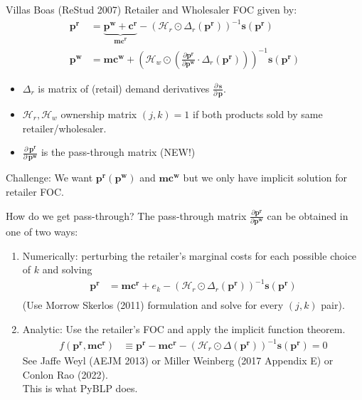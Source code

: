 \begin{frame}{Villas Boas (ReStud 2007)}
Retailer and Wholesaler FOC given by:
\begin{align*}
\symbf{p^r} &= \underbrace{\symbf{p^w} +\symbf{c^r}}_{\symbf{mc^r}} -(\mathcal{H}_r \odot \Delta_{r}(\symbf{p^r}))^{-1} \symbf{s}(\symbf{p^r})\\
\symbf{p^w}  &= \symbf{mc^w} + \left(\mathcal{H}_{w} \odot \left( \frac{\partial \symbf{p^r}}{\partial \symbf{p^w}} \cdot  \Delta_r(\symbf{p^r} ) \right) \right)^{-1} \symbf{s}(\symbf{p^r})
\end{align*}
\begin{itemize}
  \item $\Delta_r$ is matrix of (retail) demand derivatives $\frac{\partial\, \symbf{s}}{\partial\, \symbf{p}}$.
\item $\mathcal{H}_r,\mathcal{H}_w$  ownership matrix $(j,k)=1$ if both products sold by same retailer/wholesaler.
\item $\frac{\partial\, \symbf{p^r}}{\partial\, \symbf{p^w}}$ is the \alert{pass-through matrix} (NEW!)
\end{itemize}
Challenge: We want $\symbf{p^r}(\symbf{p^w})$ and $\symbf{mc^w}$ but we only have implicit solution for retailer FOC.
\end{frame}

\begin{frame}{How do we get pass-through?}
The \alert{pass-through matrix} $\frac{\partial \symbf{p^r}}{\partial \symbf{p^w}}$ can be obtained in one of two ways:
\begin{enumerate}
\item Numerically: perturbing the retailer's marginal costs for each possible choice of $k$ and solving
\begin{align*}
\symbf{p^r} &=\symbf{mc^r} + e_k -(\mathcal{H}_r \odot \Delta_{r}(\symbf{p^r}))^{-1} \symbf{s}(\symbf{p^r})\\
\end{align*}
(Use Morrow Skerlos (2011) formulation and solve for every $(j,k)$ pair).
\item Analytic: Use the retailer's FOC and apply the implicit function theorem.
\begin{align}
\tag{retailer FOC}
 f(\symbf{p^r},\symbf{mc^r}) &\equiv \symbf{p^r}  - \symbf{mc^r}-  \left(\mathcal{H}_{r} \odot \Delta(\symbf{p^r}) \right)^{-1} \symbf{s}(\symbf{p^r})=0 
\end{align}
See Jaffe Weyl (AEJM 2013) or Miller Weinberg (2017 Appendix E) or Conlon Rao (2022).\\
\alert{This is what PyBLP does}.
  \end{enumerate}

\end{frame}

